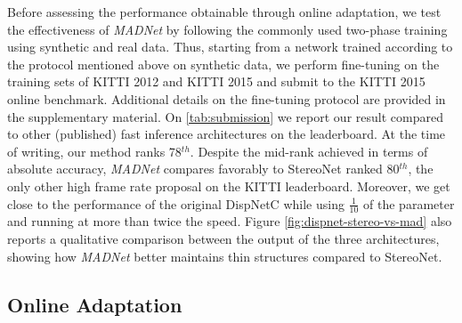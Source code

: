 \documentclass[10pt,twocolumn,letterpaper]{article}
\def\netname{\emph{MADNet}}
\def\kitti{KITTI}
\begin{document}
Before assessing the performance obtainable through online adaptation, we test the effectiveness of \netname{} by following the commonly used two-phase training using synthetic \cite{mayer2016large} and real data. Thus, starting from a network trained according to the protocol mentioned above on synthetic data, we perform fine-tuning on the training sets of \kitti{} 2012 and \kitti{} 2015 and submit to the \kitti{} 2015 online benchmark. Additional details on the fine-tuning protocol are provided in the supplementary material. On \autoref{tab:submission} we report our result compared to other (published) fast inference architectures on the leaderboard. At the time of writing, our method ranks 78$^{th}$. Despite the mid-rank achieved in terms of absolute accuracy,  \netname{} compares favorably to StereoNet \cite{khamis2018stereonet} ranked 80$^{th}$, the only other high frame rate proposal on the KITTI leaderboard. Moreover, we get close to the performance of the original DispNetC \cite{mayer2016large} while using $\frac{1}{10}$ of the parameter and running at more than twice the speed. 
Figure \ref{fig:dispnet-stereo-vs-mad} also reports a qualitative comparison between the output of the three architectures, showing how \netname{} better maintains thin structures compared to StereoNet.

\subsection{Online Adaptation}
\label{sec:exp_adaptation}
\end{document}
